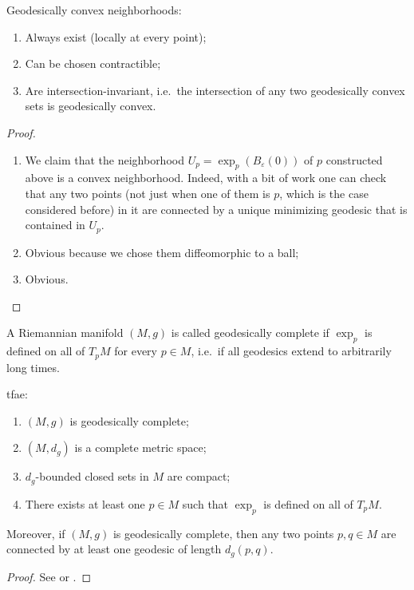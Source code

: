\documentclass[english,letterpaper]{article}%
\numberwithin{equation}{section}
\numberwithin{figure}{section}
\numberwithin{table}{section}
\theoremstyle{definition}
\theoremstyle{definition}
\theoremstyle{definition}
\theoremstyle{plain}
\theoremstyle{plain}
\theoremstyle{plain}
\theoremstyle{plain}
\theoremstyle{remark}
\theoremstyle{remark}
\begin{document}
\begin{thm}\label{geodesically convex nbhds thm}
    Geodesically convex neighborhoods:
    \begin{enumerate}
        \item Always exist (locally at every point);
        \item Can be chosen contractible;
        \item Are intersection-invariant, i.e.\ the intersection of any two geodesically convex sets is geodesically convex.
    \end{enumerate}
\end{thm}
\begin{proof}
    \begin{enumerate}
        \item We claim that the neighborhood $U_p=\exp_p(B_\varepsilon(0))$ of $p$ constructed above is a convex neighborhood. Indeed, with a bit of work one can check that any two points (not just when one of them is $p$, which is the case considered before) in it are connected by a unique minimizing geodesic that is contained in $U_p$.
        \item Obvious because we chose them diffeomorphic to a ball;
        \item Obvious.
    \end{enumerate}
\end{proof}


\begin{defn}
    A Riemannian manifold $(M,g)$ is called geodesically complete if $\exp_p$ is defined on all of $T_pM$ for every $p\in M$, i.e.\ if all geodesics extend to arbitrarily long times.
\end{defn}

\begin{thm}
    \gls{tfae}:
    \begin{enumerate}
        \item $(M,g)$ is geodesically complete;
        \item $(M,d_g)$ is a complete metric space;
        \item $d_g$-bounded closed sets in $M$ are compact;
        \item There exists at least one $p\in M$ such that $\exp_p$ is defined on all of $T_p M$.
    \end{enumerate}
    Moreover, if $(M,g)$ is geodesically complete, then any two points $p,q\in M$ are connected by at least one geodesic of length $d_g(p,q)$.
\end{thm}
\begin{proof}
    See \cite[Thm. 1.7.1]{Jost} or \cite[Thm. 10.9]{Milnor}.
\end{proof}
\end{document}
